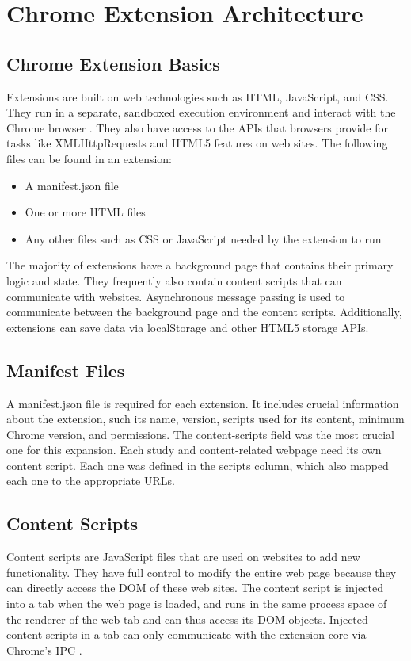 \section{Chrome Extension Architecture}

\subsection{Chrome Extension Basics}
Extensions are built on web technologies such as HTML, JavaScript, and CSS. They run in a separate, sandboxed execution environment and interact with the Chrome browser \autocite{google2021what}. They also have access to the APIs that browsers provide for tasks like XMLHttpRequests and HTML5 features on web sites. The following files can be found in an extension:

\begin{itemize}
  \item A manifest.json file
  \item One or more HTML files
  \item Any other files such as CSS or JavaScript needed by the extension to run
\end{itemize}

The majority of extensions have a background page that contains their primary logic and state. They frequently also contain content scripts that can communicate with websites. Asynchronous message passing is used to communicate between the background page and the content scripts. Additionally, extensions can save data via localStorage and other HTML5 storage APIs.

\subsection{Manifest Files}
A manifest.json file is required for each extension. It includes crucial information about the extension, such its name, version, scripts used for its content, minimum Chrome version, and permissions. The content-scripts field was the most crucial one for this expansion. Each study and content-related webpage need its own content script. Each one was defined in the scripts column, which also mapped each one to the appropriate URLs.

\subsection{Content Scripts}
Content scripts are JavaScript files that are used on websites to add new functionality. They have full control to modify the entire web page because they can directly access the DOM of these web sites. The content script is injected into a tab when the web page is loaded, and runs in the same process space of the renderer of the web tab and can thus access its DOM objects. Injected content scripts in a tab can only communicate with the extension core via Chrome's IPC \autocite{liu2012chrome}.

